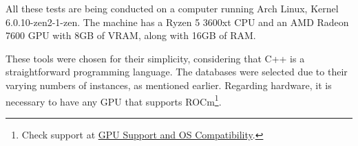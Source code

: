 All these tests are being conducted on a computer running Arch Linux, Kernel 6.0.10-zen2-1-zen. The machine has a Ryzen 5 3600xt CPU and an AMD Radeon 7600 GPU with 8GB of VRAM, along with 16GB of RAM.

These tools were chosen for their simplicity, considering that C++ is a straightforward programming language. The databases were selected due to their varying numbers of instances, as mentioned earlier. Regarding hardware, it is necessary to have any GPU that supports ROCm\footnote[2]{Check support at \href{https://rocm.docs.amd.com/en/latest/release/gpu_os_support.html}{GPU Support and OS Compatibility}.}.
